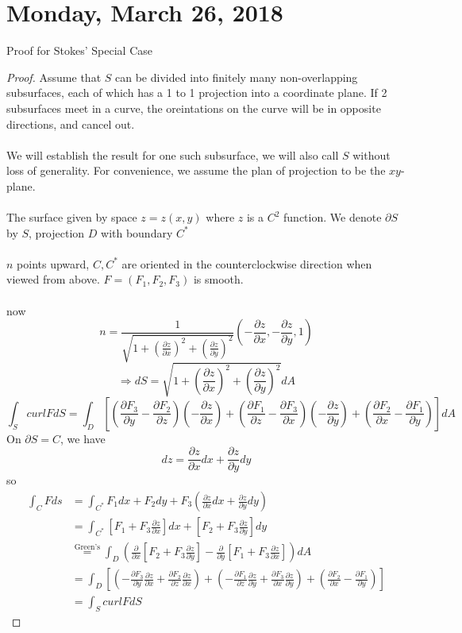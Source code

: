 \documentclass[12pt]{article}
\theoremstyle{plain}
\theoremstyle{definition}
\begin{document}
\newpage

\section{Monday, March 26, 2018}

Proof for Stokes' Special Case

\begin{proof}
	Assume that $S$ can be divided into finitely many non-overlapping subsurfaces, each of which has a 1 to 1 projection into a coordinate plane. If 2 subsurfaces meet in a curve, the oreintations on the curve will be in opposite directions, and cancel out.\\
	\\
	We will establish the result for one such subsurface, we will also call $S$ without loss of generality. For convenience, we assume the plan of projection to be the $xy$-plane.\\
	\\
	The surface given by space $z=z(x,y)$ where $z$ is a $C^2$ function. We denote $\partial S$ by $S$, projection $D$ with boundary $C^*$\\
	\\
	$n$ points upward, $C, C^*$ are oriented in the counterclockwise direction when viewed from above. $F=(F_1, F_2, F_3)$ is smooth.\\
	\\
	now $$n = \frac{1}{\sqrt{1+(\frac{\partial z}{\partial x})^2 + (\frac{\partial z}{\partial y})^2}} (-\frac{\partial z}{\partial x}, -\frac{\partial z}{\partial y}, 1)$$
	$$\Longrightarrow dS = \sqrt{1+(\frac{\partial z}{\partial x})^2 + (\frac{\partial z}{\partial y})^2} dA$$
	$$\int_S curl F dS = \int_D [(\frac{\partial F_3}{\partial y} - \frac{\partial F_2}{\partial z})(-\frac{\partial z}{\partial x}) + (\frac{\partial F_1}{\partial z} - \frac{\partial F_3}{\partial x})(-\frac{\partial z}{\partial y}) + (\frac{\partial F_2}{\partial x} - \frac{\partial F_1}{\partial y})]dA$$
	On $\partial S = C$, we have
	$$dz = \frac{\partial z}{\partial x}dx + \frac{\partial z}{\partial y}dy$$
	so
	\begin{align*}
		\int_C F ds &= \int_{C^*} F_1 dx + F_2dy+F_3(\frac{\partial z}{\partial x}dx + \frac{\partial z}{\partial y}dy)\\
		&= \int_{C^*} [F_1 + F_3\frac{\partial z}{\partial x}]dx + [F_2 + F_3\frac{\partial z}{\partial y}]dy\\
		&\overset{\text{Green's}}{=} \int_D (\frac{\partial}{\partial x} [F_2 + F_3\frac{\partial z}{\partial y}] - \frac{\partial}{\partial y} [F_1 + F_3\frac{\partial z}{\partial x}])dA\\
		&= \int_D [(-\frac{\partial F_3}{\partial y}\frac{\partial z}{\partial x} + \frac{\partial F_2}{\partial z}\frac{\partial z}{\partial x}) + (-\frac{\partial F_1}{\partial z}\frac{\partial z}{\partial y} + \frac{\partial F_3}{\partial x}\frac{\partial z}{\partial y}) + (\frac{\partial F_2}{\partial x} - \frac{\partial F_1}{\partial y})]\\
		&= \int_S curl F dS
	\end{align*}
\end{proof}
\end{document}

